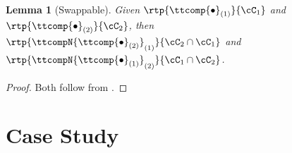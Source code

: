 \documentclass[a4paper,names,dvipsnames]{article}
\newtheorem{lemma}{Lemma}
\begin{document}
\begin{lemma}[Swappable]\label{lem:swappable}
  Given $\rtp{\ttcomp{\bullet}_{(1)}}{\cC_{1}}$ and $\rtp{\ttcomp{\bullet}_{(2)}}{\cC_{2}}$, then $\rtp{\ttcompN{\ttcomp{\bullet}_{(2)}}_{(1)}}{\cC_{2}\cap\cC_{1}}$ and $\rtp{\ttcompN{\ttcomp{\bullet}_{(1)}}_{(2)}}{\cC_{1}\cap\cC_{2}}$.
\end{lemma}
\begin{proof}
  Both follow from .
\end{proof}
\section{Case Study}

\end{document}
